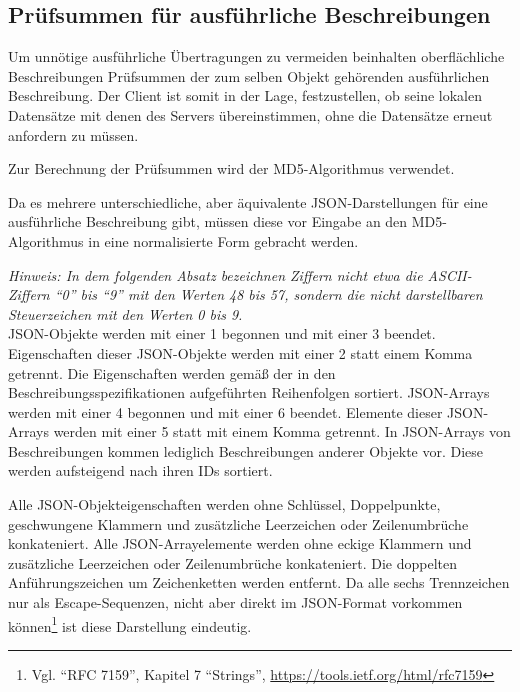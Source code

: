 \documentclass[parskip=full,11pt]{scrartcl}
\begin{document}
\subsection{Prüfsummen für ausführliche Beschreibungen}\label{sec:checksum}
\newcommand{\hashAlg}{MD5}
Um unnötige ausführliche Übertragungen zu vermeiden beinhalten oberflächliche
Beschreibungen Prüfsummen der zum selben Objekt gehörenden ausführlichen
Beschreibung.
Der Client ist somit in der Lage, festzustellen, ob seine lokalen Datensätze
mit denen des Servers übereinstimmen, ohne die Datensätze erneut anfordern zu
müssen.

\par Zur Berechnung der Prüfsummen wird der \hashAlg-Algorithmus verwendet.

\par Da es mehrere unterschiedliche, aber äquivalente JSON-Darstellungen für
eine ausführliche Beschreibung gibt, müssen diese vor Eingabe an den
\hashAlg-Algorithmus in eine normalisierte Form gebracht werden.

\par \textit{Hinweis: In dem folgenden Absatz bezeichnen Ziffern nicht etwa die
ASCII-Ziffern \enquote{0} bis \enquote{9} mit den Werten 48 bis 57, sondern die
nicht darstellbaren Steuerzeichen mit den Werten 0 bis 9.}\\
JSON-Objekte werden mit einer 1 begonnen und mit einer 3 beendet.
Eigenschaften dieser JSON-Objekte werden mit einer 2 statt einem Komma
getrennt.
Die Eigenschaften werden gemäß der in den Beschreibungsspezifikationen
aufgeführten Reihenfolgen sortiert.
JSON-Arrays werden mit einer 4 begonnen und mit einer 6 beendet.
Elemente dieser JSON-Arrays werden mit einer 5 statt mit einem Komma getrennt.
In JSON-Arrays von Beschreibungen kommen lediglich Beschreibungen anderer
Objekte vor. Diese werden aufsteigend nach ihren IDs sortiert.

Alle JSON-Objekteigenschaften werden ohne Schlüssel, Doppelpunkte, geschwungene
Klammern und zusätzliche Leerzeichen oder Zeilenumbrüche konkateniert.
Alle JSON-Arrayelemente werden ohne eckige Klammern und zusätzliche
Leerzeichen oder Zeilenumbrüche konkateniert.
Die doppelten Anführungszeichen um Zeichenketten werden entfernt.
Da alle sechs Trennzeichen nur als Escape-Sequenzen, nicht aber direkt im
JSON-Format vorkommen können\footnote{Vgl. \enquote{RFC 7159}, Kapitel 7
\enquote{Strings}, \url{https://tools.ietf.org/html/rfc7159}} ist diese
Darstellung eindeutig.
\end{document}
